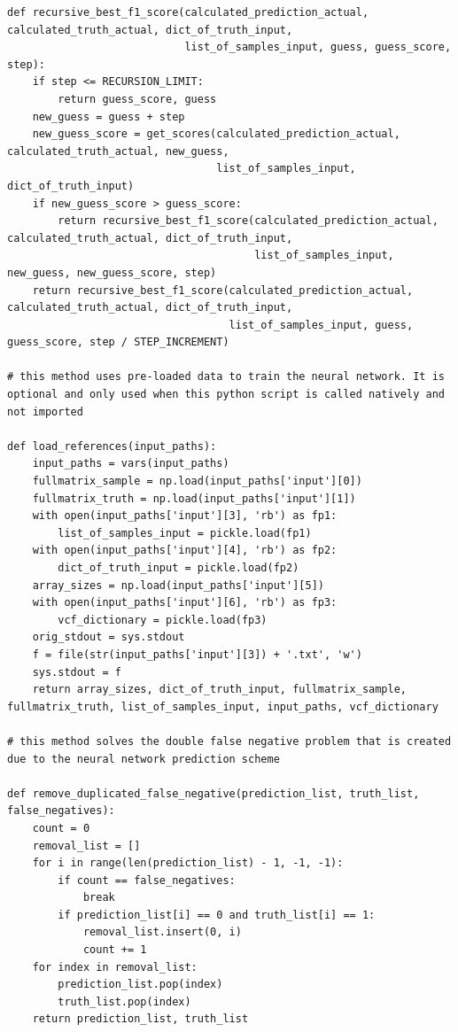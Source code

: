 \documentclass{article}
\begin{document}
\begin{verbatim}
def recursive_best_f1_score(calculated_prediction_actual, calculated_truth_actual, dict_of_truth_input,
                            list_of_samples_input, guess, guess_score, step):
    if step <= RECURSION_LIMIT:
        return guess_score, guess
    new_guess = guess + step
    new_guess_score = get_scores(calculated_prediction_actual, calculated_truth_actual, new_guess,
                                 list_of_samples_input, dict_of_truth_input)
    if new_guess_score > guess_score:
        return recursive_best_f1_score(calculated_prediction_actual, calculated_truth_actual, dict_of_truth_input,
                                       list_of_samples_input, new_guess, new_guess_score, step)
    return recursive_best_f1_score(calculated_prediction_actual, calculated_truth_actual, dict_of_truth_input,
                                   list_of_samples_input, guess, guess_score, step / STEP_INCREMENT)

# this method uses pre-loaded data to train the neural network. It is optional and only used when this python script is called natively and not imported

def load_references(input_paths):
    input_paths = vars(input_paths)
    fullmatrix_sample = np.load(input_paths['input'][0])
    fullmatrix_truth = np.load(input_paths['input'][1])
    with open(input_paths['input'][3], 'rb') as fp1:
        list_of_samples_input = pickle.load(fp1)
    with open(input_paths['input'][4], 'rb') as fp2:
        dict_of_truth_input = pickle.load(fp2)
    array_sizes = np.load(input_paths['input'][5])
    with open(input_paths['input'][6], 'rb') as fp3:
        vcf_dictionary = pickle.load(fp3)
    orig_stdout = sys.stdout
    f = file(str(input_paths['input'][3]) + '.txt', 'w')
    sys.stdout = f
    return array_sizes, dict_of_truth_input, fullmatrix_sample, fullmatrix_truth, list_of_samples_input, input_paths, vcf_dictionary

# this method solves the double false negative problem that is created due to the neural network prediction scheme
	
def remove_duplicated_false_negative(prediction_list, truth_list, false_negatives):
    count = 0
    removal_list = []
    for i in range(len(prediction_list) - 1, -1, -1):
        if count == false_negatives:
            break
        if prediction_list[i] == 0 and truth_list[i] == 1:
            removal_list.insert(0, i)
            count += 1
    for index in removal_list:
        prediction_list.pop(index)
        truth_list.pop(index)
    return prediction_list, truth_list


\end{verbatim}
\end{document}
